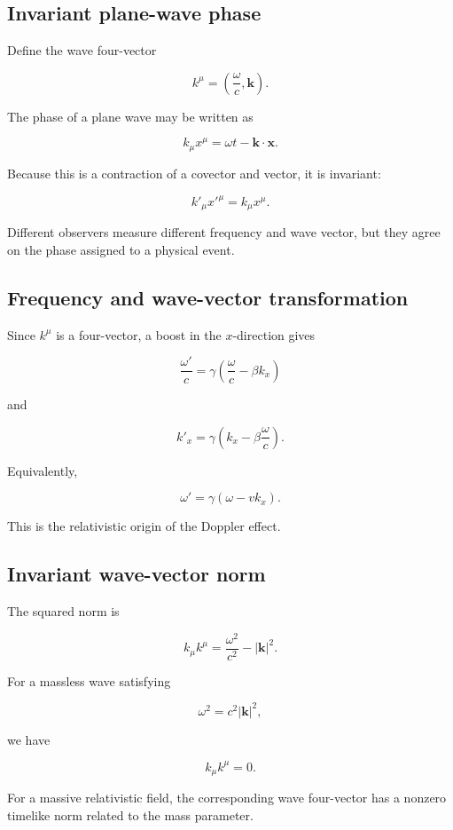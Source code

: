 \subsection{Invariant plane-wave phase}

Define the wave four-vector

\[
k^{\mu}
=
\left(
\frac{\omega}{c},
\mathbf{k}
\right).
\]

The phase of a plane wave may be written as

\[
\boxed{
k_{\mu}x^{\mu}
=
\omega t-
\mathbf{k}\cdot\mathbf{x}
}.
\]

Because this is a contraction of a covector and vector, it is invariant:

\[
k'_{\mu}x'^{\mu}
=
k_{\mu}x^{\mu}.
\]

Different observers measure different frequency and wave vector, but they agree on the phase assigned to a physical event.

\subsection{Frequency and wave-vector transformation}

Since \(k^{\mu}\) is a four-vector, a boost in the \(x\)-direction gives

\[
\boxed{
\frac{\omega'}{c}
=
\gamma\left(
\frac{\omega}{c}-\beta k_{x}
\right)
}
\]

and

\[
\boxed{
k'_{x}
=
\gamma\left(
k_{x}-\beta\frac{\omega}{c}
\right)
}.
\]

Equivalently,

\[
\boxed{
\omega'
=
\gamma(\omega-vk_{x})
}.
\]

This is the relativistic origin of the Doppler effect.

\subsection{Invariant wave-vector norm}

The squared norm is

\[
k_{\mu}k^{\mu}
=
\frac{\omega^{2}}{c^{2}}
-
|\mathbf{k}|^{2}.
\]

For a massless wave satisfying

\[
\omega^{2}=c^{2}|\mathbf{k}|^{2},
\]

we have

\[
\boxed{
k_{\mu}k^{\mu}=0
}.
\]

For a massive relativistic field, the corresponding wave four-vector has a nonzero timelike norm related to the mass parameter.

